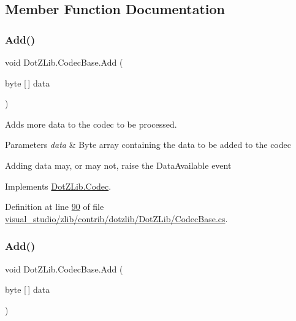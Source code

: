 \subsection{Member Function Documentation}
\mbox{\label{class_dot_z_lib_1_1_codec_base_a9131ff23312ada67dbf58f428d562de4}} 
\subsubsection{\texorpdfstring{Add()}{Add()}\hspace{0.1cm}{\footnotesize\ttfamily [1/4]}}
{\footnotesize\ttfamily void Dot\+Z\+Lib.\+Codec\+Base.\+Add (\begin{DoxyParamCaption}\item[{byte \mbox{[}$\,$\mbox{]}}]{data }\end{DoxyParamCaption})\hspace{0.3cm}{\ttfamily [inline]}}



Adds more data to the codec to be processed. 


\begin{DoxyParams}{Parameters}
{\em data} & Byte array containing the data to be added to the codec\\
\hline
\end{DoxyParams}


Adding data may, or may not, raise the {\ttfamily Data\+Available} event

Implements \hyperlink{interface_dot_z_lib_1_1_codec_aa40d0820bd95f098b3e7d8e707e7a536}{Dot\+Z\+Lib.\+Codec}.



Definition at line \hyperlink{visual__studio_2zlib_2contrib_2dotzlib_2_dot_z_lib_2_codec_base_8cs_source_l00090}{90} of file \hyperlink{visual__studio_2zlib_2contrib_2dotzlib_2_dot_z_lib_2_codec_base_8cs_source}{visual\+\_\+studio/zlib/contrib/dotzlib/\+Dot\+Z\+Lib/\+Codec\+Base.\+cs}.

\mbox{\label{class_dot_z_lib_1_1_codec_base_a9131ff23312ada67dbf58f428d562de4}} 
\subsubsection{\texorpdfstring{Add()}{Add()}\hspace{0.1cm}{\footnotesize\ttfamily [2/4]}}
{\footnotesize\ttfamily void Dot\+Z\+Lib.\+Codec\+Base.\+Add (\begin{DoxyParamCaption}\item[{byte \mbox{[}$\,$\mbox{]}}]{data }\end{DoxyParamCaption})\hspace{0.3cm}{\ttfamily [inline]}}



